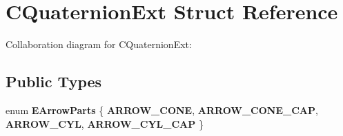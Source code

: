 \hypertarget{struct_c_quaternion_ext}{\section{C\+Quaternion\+Ext Struct Reference}
\label{struct_c_quaternion_ext}
}


Collaboration diagram for C\+Quaternion\+Ext\+:
\subsection*{Public Types}
\begin{DoxyCompactItemize}
\item 
\hypertarget{struct_c_quaternion_ext_a640d973b75e9d319e3e51e880ec8412b}{enum {\bfseries E\+Arrow\+Parts} \{ {\bfseries A\+R\+R\+O\+W\+\_\+\+C\+O\+N\+E}, 
{\bfseries A\+R\+R\+O\+W\+\_\+\+C\+O\+N\+E\+\_\+\+C\+A\+P}, 
{\bfseries A\+R\+R\+O\+W\+\_\+\+C\+Y\+L}, 
{\bfseries A\+R\+R\+O\+W\+\_\+\+C\+Y\+L\+\_\+\+C\+A\+P}
 \}}\label{struct_c_quaternion_ext_a640d973b75e9d319e3e51e880ec8412b}

\end{DoxyCompactItemize}
